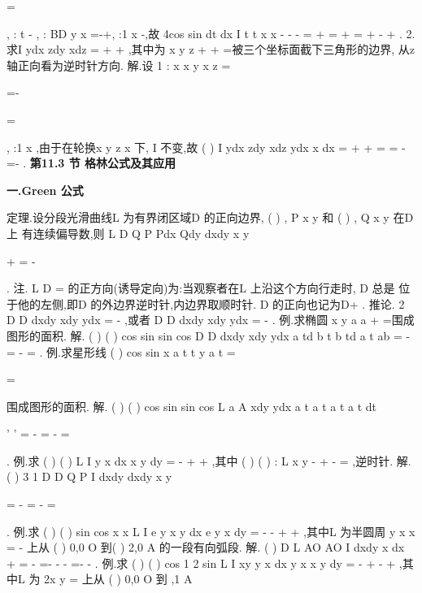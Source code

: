 =

, :
t
\pi 
-
\to 
,
:
BD y
x
=-+,
:1
x
\to -,故 
4cos
sin
dt
dx
I
t
t
x
x
\pi 
\pi 
\pi 
\pi 
-
-
-
=
+
=
+
=
+
-
+
\int 
\int 
. 
2.求I
ydx
zdy
xdz
\Gamma 
=
+
+
\int \nabla 
,其中\Gamma 为
x
y
z
+
+
=被三个坐标面截下三角形的边界, 
从z 轴正向看为逆时针方向. 
解.设
1 :
x
x
y
x
z
=


\Gamma 
=-

=

,
:1
x
\to 
,由于在轮换x
y
z
x
\to 
\to 
\to 
下, I 不变,故 
(
)
I
ydx
zdy
xdz
ydx
x dx
\Gamma 
\Gamma 
=
+
+
=
=
-
=-
\int 
\int 
\int 
. 
\vspace{6pt}
{\large \bfseries \textcolor{lyred}{第11.3 节 格林公式及其应用}}

\vspace{4pt}
{\bfseries \textcolor{lyred}{一.Green 公式}}

\textcolor{lyred}{定理}.设分段光滑曲线L 为有界闭区域D 的正向边界, (
)
,
P x y 和
(
)
,
Q x y 在D 上 
有连续偏导数,则
L
D
Q
P
Pdx
Qdy
dxdy
x
y


\partial 
\partial 
+
=
-


\partial 
\partial 


\int 
\int \int 
\nabla 
. 
\textcolor{lyred}{注}. L
D
=\partial 
的正方向(诱导定向)为:当观察者在L 上沿这个方向行走时, D 总是 
位于他的左侧,即D 的外边界逆时针,内边界取顺时针. D
\partial 
的正向也记为D+
\partial 
. 
\textcolor{lyred}{推论}. 2
D
D
dxdy
xdy
ydx
\partial 
=
-
\int \int 
\int \nabla 
,或者
D
D
dxdy
xdy
ydx
\partial 
=
-
\int \int 
\int \nabla 
. 
\textcolor{lyred}{例}.求椭圆
x
y
a
a
+
=围成图形的面积. 
解.
(
)
(
)
cos
sin
sin
cos
D
D
dxdy
xdy
ydx
a
td b
t
b
td a
t
ab
\pi 
\pi 
\partial 
=
-
=
-
=
\int \int 
\int 
\int 
. 
\textcolor{lyred}{例}.求星形线
(
)
cos
sin
x
a
t
t
y
a
t
\pi 
=
\le \le 

=

围成图形的面积. 
解.
(
)
(
)
cos
sin
sin
cos
L
a
A
xdy
ydx
a
t
a
t
a
t
a
t
dt
\pi 
\pi 


'
'
=
-
=
\cdots 
-
\cdots 
=




\int 
\int 
\nabla 
. 
\textcolor{lyred}{例}.求
(
)
(
)
L
I
y
x dx
x
y dy
=
-
+
+
\int \nabla 
,其中
(
)
(
)
:
L
x
y
-
+
-
=
,逆时针. 
解.
(
)
3 1
D
D
Q
P
I
dxdy
dxdy
x
y
\pi 


\partial 
\partial 
=
-
=
-
=


\partial 
\partial 


\int \int 
\int \int 
. 
\textcolor{lyred}{例}.求
(
)
(
)
sin
cos
x
x
L
I
e
y
x
y dx
e
y
x dy
=
-
-
+
+
\int 
,其中L 为半圆周
y
x
x
=
-
上从 
(
)
0,0
O
到(
)
2,0
A
的一段有向弧段. 
解.
(
)
D
L AO
AO
I
dxdy
x dx
\pi 
+
=
-
=-
-
-
=-
-
\int 
\int 
\int \int 
\int 
\nabla 
. 
\textcolor{lyred}{例}.求
(
)
(
)
cos
1 2 sin
L
I
xy
y
x dx
y
x
x y
dy
=
-
+
-
+
\int 
,其中L 为
2x
y
\pi 
=
上从 
(
)
0,0
O
到
,1
A \pi 






